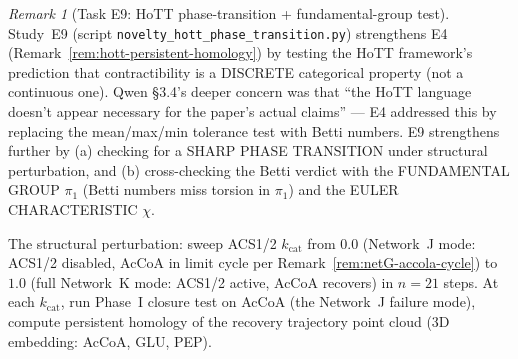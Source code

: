 \documentclass[11pt,a4paper]{article}
\theoremstyle{plain}
\theoremstyle{definition}
\theoremstyle{remark}
\newtheorem{remark}[theorem]{Remark}
\begin{document}
\begin{remark}[Task E9: HoTT phase-transition + fundamental-group
test]
\label{rem:hott-phase-transition-v5}
Study~E9 (script \texttt{novelty\_hott\_phase\_transition.py})
strengthens E4 (Remark~\ref{rem:hott-persistent-homology}) by testing
the HoTT framework's prediction that contractibility is a DISCRETE
categorical property (not a continuous one). Qwen \S 3.4's deeper
concern was that ``the HoTT language doesn't appear necessary for the
paper's actual claims'' --- E4 addressed this by replacing the
mean/max/min tolerance test with Betti numbers. E9 strengthens further
by (a) checking for a SHARP PHASE TRANSITION under structural
perturbation, and (b) cross-checking the Betti verdict with the
FUNDAMENTAL GROUP $\pi_1$ (Betti numbers miss torsion in $\pi_1$)
and the EULER CHARACTERISTIC $\chi$.

The structural perturbation: sweep ACS1/2 $k_{\mathrm{cat}}$ from
$0.0$ (Network~J mode: ACS1/2 disabled, AcCoA in limit cycle per
Remark~\ref{rem:netG-accola-cycle}) to $1.0$ (full Network~K mode:
ACS1/2 active, AcCoA recovers) in $n = 21$ steps. At each
$k_{\mathrm{cat}}$, run Phase~I closure test on AcCoA (the Network~J
failure mode), compute persistent homology of the recovery trajectory
point cloud (3D embedding: AcCoA, GLU, PEP).


\end{remark}
\end{document}
